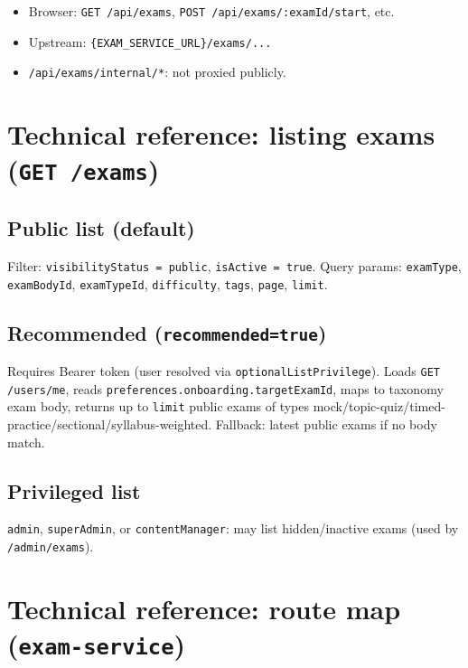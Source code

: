 \documentclass[11pt,a4paper]{article}
\begin{document}
\begin{itemize}[leftmargin=*]
  \item Browser: \texttt{GET /api/exams}, \texttt{POST /api/exams/:examId/start}, etc.
  \item Upstream: \texttt{\{EXAM\_SERVICE\_URL\}/exams/...}
  \item \texttt{/api/exams/internal/*}: not proxied publicly.
\end{itemize}

\section{Technical reference: listing exams (\texttt{GET /exams})}

\subsection{Public list (default)}

Filter: \texttt{visibilityStatus = public}, \texttt{isActive = true}. Query params: \texttt{examType}, \texttt{examBodyId}, \texttt{examTypeId}, \texttt{difficulty}, \texttt{tags}, \texttt{page}, \texttt{limit}.

\subsection{Recommended (\texttt{recommended=true})}

Requires Bearer token (user resolved via \texttt{optionalListPrivilege}). Loads \texttt{GET /users/me}, reads \texttt{preferences.onboarding.targetExamId}, maps to taxonomy exam body, returns up to \texttt{limit} public exams of types mock/topic-quiz/timed-practice/sectional/syllabus-weighted. Fallback: latest public exams if no body match.

\subsection{Privileged list}

\texttt{admin}, \texttt{superAdmin}, or \texttt{contentManager}: may list hidden/inactive exams (used by \texttt{/admin/exams}).

\section{Technical reference: route map (\texttt{exam-service})}
\end{document}
